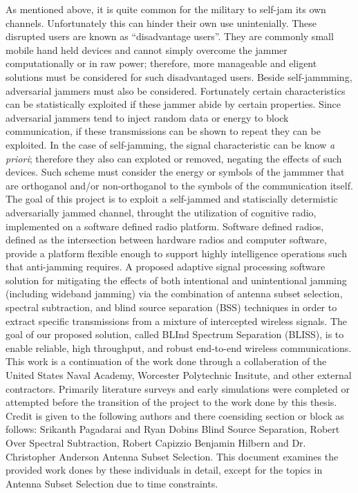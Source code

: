 As mentioned above, it is quite common for the military to self-jam its own channels.  Unfortunately this can hinder their own use unintenially.  These disrupted users are known as ``disadvantage users''.  They are commonly small mobile hand held devices and cannot simply overcome the jammer computationally or in raw power; therefore, more manageable and eligent solutions must be considered for such disadvantaged users.  Beside self-jammming, adversarial jammers must also be considered.  Fortunately certain characteristics can be statistically exploited if these jammer abide by certain properties. Since adversarial jammers tend to inject random data or energy to block communication, if these transmissions can be shown to repeat they can be exploited.  In the case of self-jamming, the signal characteristic can be know \textit{a priori}; therefore they also can exploted or removed, negating the effects of such devices.  Such scheme must consider the energy or symbols of the jammmer that are orthoganol and/or non-orthoganol to the symbols of the communication itself.\\


The goal of this project is to exploit a self-jammed and statiscially determistic adversarially jammed channel, throught the utilization of cognitive radio, implemented on a software defined radio platform.  Software defined radios, defined as the intersection between hardware radios and computer software\cite{4}, provide a platform flexible enough to support highly intelligence operations such that anti-jamming requires.  A proposed adaptive signal processing software solution for mitigating the effects of both intentional and unintentional jamming (including wideband jamming) via the combination of antenna subset selection, spectral subtraction, and blind source separation (BSS) techniques in order to extract specific transmissions from a mixture of intercepted wireless signals. The goal of our proposed solution, called BLInd Spectrum Separation (BLISS), is to enable reliable, high throughput, and robust end-to-end wireless communications.\\

This work is a continuation of the work done through a collaberation of the United States Naval Academy, Worcester Polytechnic Insitute, and other external contractors.  Primarily literature surveys and early simulations were completed or attempted before the transition of the project to the work done by this thesis.  Credit is given to the following authors and there coensiding section or block as follows: Srikanth Pagadarai and Ryan Dobins Blind Source Separation, Robert Over Spectral Subtraction, Robert Capizzio Benjamin Hilbern and Dr. Christopher Anderson Antenna Subset Selection.  This document examines the provided work dones by these individuals in detail, except for the topics in Antenna Subset Selection due to time constraints.\\

